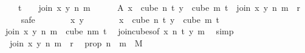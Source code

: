 \begin{isabellebody}
\ \ \ \ {\isacharparenleft}{\kern0pt}t\ {\isacharplus}{\kern0pt}\ {}{\isacharparenright}{\kern0pt}{\isachardot}{\kern0pt}\ {\isasymchi}\ {\isacharparenleft}{\kern0pt}join\ x\ y\ n\ m{\isacharparenright}{\kern0pt}{\isacharparenright}{\kern0pt}{\isacharparenright}{\kern0pt}{\isachardoublequoteclose}\isanewline
\ \ \ \ \isamarkupfalse%
\ A{\isacharcolon}{\kern0pt}\ {\isachardoublequoteopen}{\isasymforall}x\ {\isasymin}\ cube\ n\ {\isacharparenleft}{\kern0pt}t{\isacharplus}{\kern0pt}{}{\isacharparenright}{\kern0pt}{\isachardot}{\kern0pt}\ {\isasymforall}y\ {\isasymin}\ cube\ m\ {\isacharparenleft}{\kern0pt}t{\isacharplus}{\kern0pt}{}{\isacharparenright}{\kern0pt}{\isachardot}{\kern0pt}\ {\isasymchi}\ {\isacharparenleft}{\kern0pt}join\ x\ y\ n\ m{\isacharparenright}{\kern0pt}\ {\isasymin}\ {\isacharbraceleft}{\kern0pt}{\isachardot}{\kern0pt}{\isachardot}{\kern0pt}{\isacharless}{\kern0pt}r{\isacharbraceright}{\kern0pt}{\isachardoublequoteclose}\isanewline
\ \ \ \ \isamarkupfalse%
{\isacharparenleft}{\kern0pt}safe{\isacharparenright}{\kern0pt}\isanewline
\ \ \ \ \ \ \isamarkupfalse%
\ x\ y\isanewline
\ \ \ \ \ \ \isamarkupfalse%
\ {\isachardoublequoteopen}x\ {\isasymin}\ cube\ n\ {\isacharparenleft}{\kern0pt}t{\isacharplus}{\kern0pt}{}{\isacharparenright}{\kern0pt}{\isachardoublequoteclose}\ {\isachardoublequoteopen}y\ {\isasymin}\ cube\ m\ {\isacharparenleft}{\kern0pt}t{\isacharplus}{\kern0pt}{}{\isacharparenright}{\kern0pt}{\isachardoublequoteclose}\isanewline
\ \ \ \ \ \ \isamarkupfalse%
\ \isamarkupfalse%
\ {\isachardoublequoteopen}join\ x\ y\ n\ m\ {\isasymin}\ cube\ {\isacharparenleft}{\kern0pt}n{\isacharplus}{\kern0pt}m{\isacharparenright}{\kern0pt}\ {\isacharparenleft}{\kern0pt}t{\isacharplus}{\kern0pt}{}{\isacharparenright}{\kern0pt}{\isachardoublequoteclose}\ \isamarkupfalse%
\ join{\isacharunderscore}{\kern0pt}cubes{\isacharbrackleft}{\kern0pt}of\ x\ n\ t\ y\ m{\isacharbrackright}{\kern0pt}\ \isamarkupfalse%
\ simp\isanewline
\ \ \ \ \ \ \isamarkupfalse%
\ \isamarkupfalse%
\ {\isachardoublequoteopen}{\isasymchi}\ {\isacharparenleft}{\kern0pt}join\ x\ y\ n\ m{\isacharparenright}{\kern0pt}\ {\isacharless}{\kern0pt}\ r{\isachardoublequoteclose}\ \isamarkupfalse%
\ {\isasymchi}{\isacharunderscore}{\kern0pt}prop\ {\isacartoucheopen}n\ {\isacharplus}{\kern0pt}\ m\ {\isacharequal}{\kern0pt}\ M{\isacharprime}{\kern0pt}{\isacartoucheclose}\ \isamarkupfalse%

\end{isabellebody}
